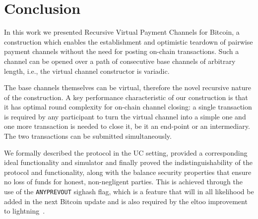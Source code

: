 \section{Conclusion}

  In this work we presented Recursive Virtual Payment Channels for Bitcoin, a
  construction which enables the establishment and optimistic teardown of
  pairwise payment channels without the need for posting on-chain transactions.
  Such a channel can be opened over a path of consecutive base channels of
  arbitrary length, i.e., the virtual channel constructor is variadic.

  The base channels themselves can be virtual, therefore the novel recursive
  nature of the construction. A key performance characteristic of our
  construction is that it has optimal round complexity for on-chain channel
  closing: a single transaction is required by any participant to turn the
  virtual channel into a simple one and one more transaction is needed to close
  it, be it an end-point or an intermediary. The two transactions can be
  submitted simultaneously.

  We formally described the protocol in the UC setting, provided a corresponding
  ideal functionality and simulator and finally proved the indistinguishability
  of the protocol and functionality, along with the balance security properties
  that ensure no loss of funds for honest, non-negligent parties. This is
  achieved through the use of the \texttt{ANYPREVOUT} sighash flag, which is a
  feature that will in all likelihood be added in the next Bitcoin update and is
  also required by the eltoo improvement to lightning~\cite{eltoo}.

\newpage
\appendix
